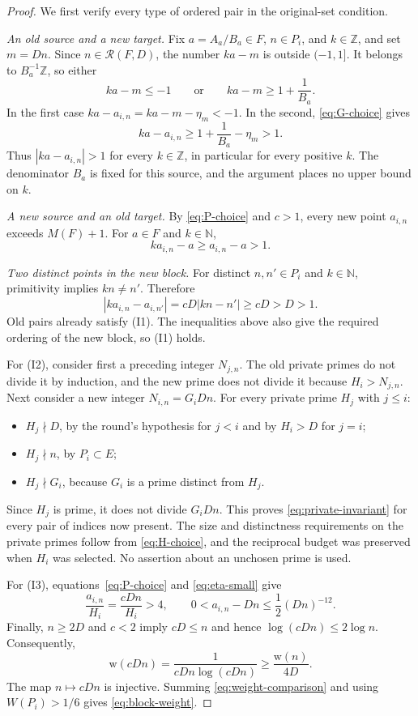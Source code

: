 \documentclass[11pt,reqno]{amsart}
\theoremstyle{definition}
\theoremstyle{remark}
\numberwithin{equation}{section}
\newcommand{\N}{\mathbb N}
\newcommand{\Z}{\mathbb Z}
\newcommand{\wt}{\mathrm w}
\newcommand{\cR}{\mathcal R}
\begin{document}
\begin{proof}
We first verify every type of ordered pair in the original-set condition.

\smallskip
\noindent\emph{An old source and a new target.}
Fix $a=A_a/B_a\in F$, $n\in P_i$, and $k\in\Z$, and set $m=Dn$.
Since $n\in\cR(F,D)$, the number $ka-m$ is outside $(-1,1]$.
It belongs to $B_a^{-1}\Z$, so either
\[
 ka-m\leq-1\qquad\text{or}\qquad ka-m\geq1+\frac1{B_a}.
\]
In the first case $ka-a_{i,n}=ka-m-\eta_m<-1$. In the second,
\eqref{eq:G-choice} gives
\[
 ka-a_{i,n}\geq1+\frac1{B_a}-\eta_m
 >1.
\]
Thus $|ka-a_{i,n}|>1$ for every $k\in\Z$, in particular for every
positive $k$. The denominator $B_a$ is fixed for this source, and the
argument places no upper bound on $k$.

\smallskip
\noindent\emph{A new source and an old target.}
By \eqref{eq:P-choice} and $c>1$, every new point $a_{i,n}$ exceeds
$M(F)+1$. For $a\in F$ and $k\in\N$,
\[
 ka_{i,n}-a\geq a_{i,n}-a>1.
\]

\smallskip
\noindent\emph{Two distinct points in the new block.}
For distinct $n,n'\in P_i$ and $k\in\N$, primitivity implies
$kn\ne n'$. Therefore
\[
 |ka_{i,n}-a_{i,n'}|=cD|kn-n'|\geq cD>D>1.
\]
Old pairs already satisfy (I1). The inequalities above also give the
required ordering of the new block, so (I1) holds.

For (I2), consider first a preceding integer $N_{j,n}$. The old private
primes do not divide it by induction, and the new prime does not divide
it because $H_i>N_{j,n}$. Next consider a new integer
$N_{i,n}=G_iDn$. For every private prime $H_j$ with $j\leq i$:
\begin{itemize}
\item $H_j\nmid D$, by the round's hypothesis for $j<i$ and by $H_i>D$
for $j=i$;
\item $H_j\nmid n$, by $P_i\subset E$;
\item $H_j\nmid G_i$, because $G_i$ is a prime distinct from $H_j$.
\end{itemize}
Since $H_j$ is prime, it does not divide $G_iDn$. This proves
\eqref{eq:private-invariant} for every pair of indices now present.
The size and distinctness requirements on the private primes follow
from \eqref{eq:H-choice}, and the reciprocal budget was preserved when
$H_i$ was selected. No assertion about an unchosen prime is used.

For (I3), equations~\eqref{eq:P-choice} and \eqref{eq:eta-small} give
\[
 \frac{a_{i,n}}{H_i}=\frac{cDn}{H_i}>4,
 \qquad 0<a_{i,n}-Dn\leq\frac12(Dn)^{-12}.
\]
Finally, $n\geq2D$ and $c<2$ imply $cD\leq n$ and hence
$\log(cDn)\leq2\log n$. Consequently,
\begin{equation}\label{eq:weight-comparison}
 \wt(cDn)=\frac1{cDn\log(cDn)}
 \geq\frac{\wt(n)}{4D}.
\end{equation}
The map $n\mapsto cDn$ is injective. Summing
\eqref{eq:weight-comparison} and using $W(P_i)>1/6$ gives
\eqref{eq:block-weight}.
\end{proof}
\end{document}
